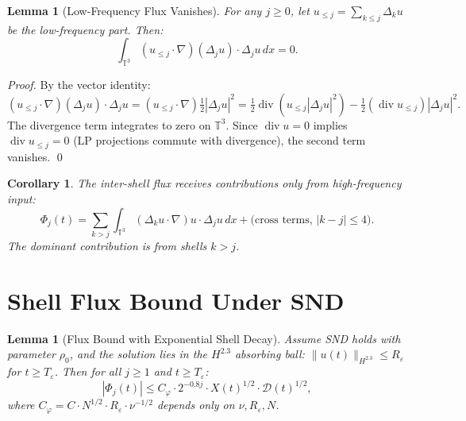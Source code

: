 \documentclass[11pt]{article}
\newtheorem{lemma}[theorem]{Lemma}
\newtheorem{corollary}[theorem]{Corollary}
\begin{document}
\begin{lemma}[Low-Frequency Flux Vanishes]\label{lem:cancel}
For any $j\geq 0$, let $u_{\leq j} = \sum_{k\leq j}\Delta_k u$
be the low-frequency part. Then:
\[
\int_{\mathbb{T}^3} (u_{\leq j}\cdot\nabla)(\Delta_j u)\cdot \Delta_j u\,dx = 0.
\]
\end{lemma}

\begin{proof}
By the vector identity:
\[
(u_{\leq j}\cdot\nabla)(\Delta_j u)\cdot\Delta_j u
= (u_{\leq j}\cdot\nabla)\tfrac{1}{2}|\Delta_j u|^2
= \tfrac{1}{2}\operatorname{div}(u_{\leq j}|\Delta_j u|^2)
  - \tfrac{1}{2}(\operatorname{div}u_{\leq j})|\Delta_j u|^2.
\]
The divergence term integrates to zero on $\mathbb{T}^3$.
Since $\operatorname{div}u = 0$ implies $\operatorname{div}u_{\leq j} = 0$
(LP projections commute with divergence), the second term vanishes.
\qed
\end{proof}

\begin{corollary}\label{cor:hf}
The inter-shell flux receives contributions only from high-frequency input:
\[
\Phi_j(t) = \sum_{k > j} \int_{\mathbb{T}^3}
(\Delta_k u\cdot\nabla)u\cdot\Delta_j u\,dx + \text{(cross terms, }|k-j|\leq 4\text{)}.
\]
The dominant contribution is from shells $k > j$.
\end{corollary}

\section{Shell Flux Bound Under SND}

\begin{lemma}[Flux Bound with Exponential Shell Decay]\label{lem:flux}
Assume SND holds with parameter $\rho_0$, and the solution lies in
the $H^{2.3}$ absorbing ball: $\|u(t)\|_{H^{2.3}}\leq R_\varepsilon$ for $t\geq T_\varepsilon$.
Then for all $j\geq 1$ and $t\geq T_\varepsilon$:
\[
|\Phi_j(t)| \leq C_\varphi \cdot 2^{-0.8j} \cdot X(t)^{1/2}\cdot\mathcal{D}(t)^{1/2},
\]
where $C_\varphi = C \cdot N^{1/2}\cdot R_\varepsilon\cdot\nu^{-1/2}$
depends only on $\nu, R_\varepsilon, N$.
\end{lemma}
\end{document}
